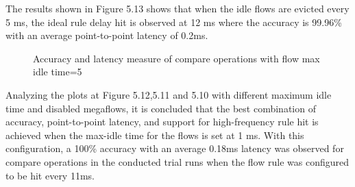 The results shown in Figure 5.13 shows that when the idle flows are evicted every 5 ms, the ideal rule delay hit is observed at 12 ms where the accuracy is 99.96\% with an average point-to-point latency of 0.2ms.

\begin{figure}[H]  
 
 \caption{Accuracy and latency measure of compare operations with flow max idle time=5}
 \hfil{}
\end{figure}

Analyzing the plots at Figure 5.12,5.11 and 5.10 with different maximum idle time and disabled megaflows, it is concluded that the best combination of accuracy, point-to-point latency, and support for high-frequency rule hit is achieved when the max-idle time for the flows is set at 1 ms. With this configuration, a 100\% accuracy with an average 0.18ms latency was observed for compare operations in the conducted trial runs when the flow rule was configured to be hit every 11ms.



